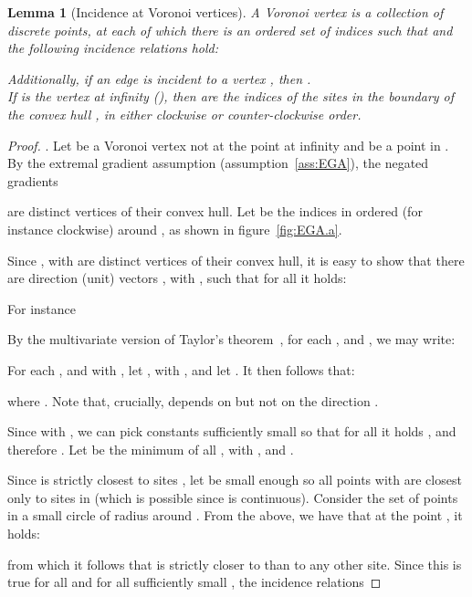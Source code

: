 \documentclass[11pt]{article}
\newtheorem{lemma}{Lemma}
\begin{document}
\begin{lemma}[Incidence at Voronoi vertices]\label{lem:vertexincidence}
	A Voronoi vertex  is a collection of discrete points, 
		at each of which there is an ordered set of indices  
		such that  and the following incidence relations hold:
	
	Additionally, if an edge  is incident to a vertex , then .\\
	If  is the vertex at infinity (), then  
		are the indices of the sites in the boundary of the convex hull , 
		in either clockwise or counter-clockwise order. \end{lemma}
\begin{proof}
.
Let  be a Voronoi vertex not at the point at infinity and 
	 be a point in . 
By the extremal gradient assumption (assumption~\ref{ass:EGA}), 
	the negated gradients 
	
are distinct vertices of their convex hull. 
Let  be the indices in  ordered (for instance clockwise) 
	around , as shown in figure~\ref{fig:EGA.a}. 



Since , with  are distinct vertices of their convex hull, 
	it is easy to show that there are direction (unit) vectors , with , 
	such that for all  it holds:
	
For instance 
	



By the multivariate version of Taylor's theorem~\cite[p.\ 68]{konigsberger2006analysis}, 
	for each , and , we may write:
	
For each , and  with , let , with , 
	and let . 
It then follows that:
	
where . 
Note that, crucially,  depends on  but not on the direction . 



Since  with , 
	we can pick constants  sufficiently small so that 
	for all  it holds , 
	and therefore . 
Let  be the minimum of all , with , and . 



Since  is strictly closest to sites , 
	let  be small enough so all points  with  
	are closest only to sites in  (which is possible since  is continuous). 
Consider the set of points in a small circle of radius  around . 
From the above, we have that at the point , it holds:
	
from which it follows that  is strictly closer to  than to any other site. 
Since this is true for all  and for all sufficiently small , the incidence relations
	

\end{proof}
\end{document}
